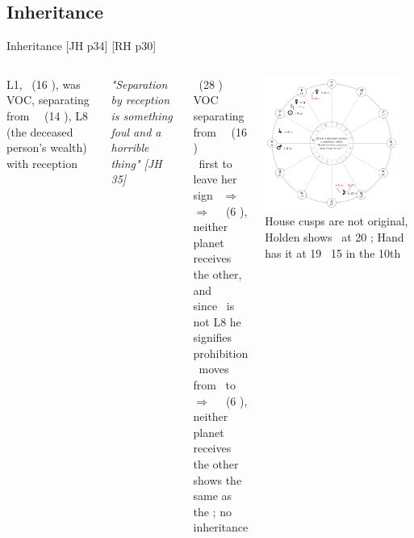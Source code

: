 \subsection{Inheritance}
\begin{frame}[t]{Inheritance [JH p34] [RH p30]}
\begin{columns}[T, onlytextwidth]
L1, \Venus\ (16 \Aquarius), was VOC, separating from \Square\  \Jupiter\ (14 \Taurus), L8 (the deceased person's wealth) with reception
\begin{block}{}
\textsl{"Separation by reception is something foul and a horrible thing" [JH 35]}
\end{block}
\Moon\ (28 \Leo) VOC separating from \Opposition\ \Venus\ (16 \Aquarius) \\
\Moon\ first to leave her sign \Leo\ $\Rightarrow$ \Virgo \\
$\Rightarrow$ \Square\ \Mars\ (6 \Virgo), neither planet receives the other, and \\
since \Mars\ is not L8 he signifies prohibition \\
\vspace{0.25cm}
\Venus\ moves from \Aquarius\ to \Pisces \\
$\Rightarrow$ \Square\ \Mars\ (6 \Pisces), neither planet receives the other \\
shows the same as the \Moon; no inheritance

\begin{center}
{\includegraphics[width=0.9\textwidth]{charts/40-chart-inheritance}} \\
\small
House cusps are not original, Holden shows \Mercury\ at 20 \Pisces; Hand has it at 19 \Pisces\ 15 in the 10th
\end{center}
\end{columns}
\end{frame}